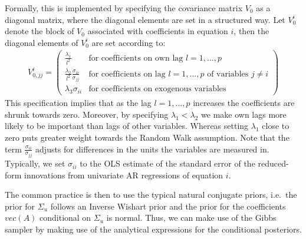 \begin{enumerate}
\begin{enumerate}
Formally, this is implemented by specifying the covariance matrix \(V_0\) as a diagonal matrix,
  where the diagonal elements are set in a structured way.
Let \(V^i_{0}\) denote the block of \(V_0\) associated with coefficients in equation \(i\),
  then the diagonal elements of \(V^i_{0}\) are set according to:
\begin{align*}
V^i_{0,jj}
=
\begin{pmatrix}
\frac{\lambda_{1}}{l^2} & \text{for coefficients on own lag \(l=1,\ldots,p\)}
\\
\frac{\lambda_{2}}{l^2} \frac{\sigma_{ii}}{\sigma_{jj}} & \text{for coefficients on lag \(l=1,\ldots,p\) of variables \(j\neq i\)}
\\
\lambda_3 \sigma_{ii} & \text{for coefficients on exogenous variables}
\end{pmatrix}
\end{align*}
This specification implies that as the lag \(l=1,\ldots,p\) increases the coefficients are shrunk towards zero.
Moreover, by specifying \(\lambda_1<\lambda_2\) we make own lags more likely to be important than lags of other variables.
Whereas setting \(\lambda_1\) close to zero puts greater weight towards the Random Walk assumption.
Note that the term \(\frac{\sigma_{ii}}{\sigma_{jj}}\) adjusts for differences in the units the variables are measured in. 
Typically, we set \(\sigma_{ii}\) to the OLS estimate of the standard error of the reduced-form innovations from univariate AR regressions of equation \(i\).

The common practice is then to use the typical natural conjugate priors,
  i.e.\ the prior for \(\Sigma_u\) follows an Inverse Wishart prior and the prior for the coefficients \(vec(A)\) conditional on \(\Sigma_u\) is normal.
Thus, we can make use of the Gibbs sampler by making use of the analytical expressions for the conditional posteriors.
\end{enumerate}

\end{enumerate}